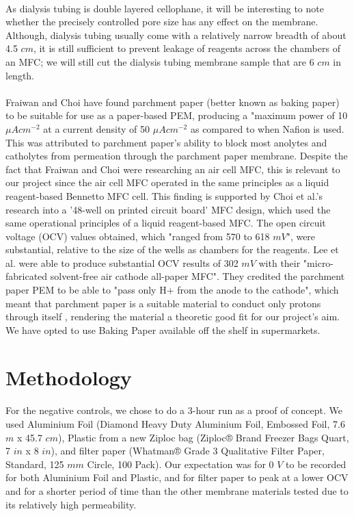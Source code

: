 \documentclass[12pt, twocolumn, a4paper]{article}
\begin{document}
    \paragraph{}As dialysis tubing is double layered cellophane, it will be interesting to note whether the precisely controlled pore size has any effect on the membrane. Although, dialysis tubing usually come with a relatively narrow breadth of about 4.5 $cm$, it is still sufficient to prevent leakage of reagents across the chambers of an MFC; we will still cut the dialysis tubing membrane sample that are 6 $cm$ in length.

   \paragraph{}Fraiwan and Choi \cite{C4CP04804K} have found parchment paper (better known as baking paper) to be suitable for use as a paper-based PEM, producing a "maximum power of 10 $\mu A cm^{-2}$ at a current density of 50 $\mu A cm^{-2}$ as compared to when Nafion is used.  This was attributed to parchment paper's ability to block most anolytes and catholytes from permeation through the parchment paper membrane. Despite the fact that Fraiwan and Choi were researching an air cell MFC, this is relevant to our project since the air cell MFC operated in the same principles as a liquid reagent-based Bennetto MFC cell. This finding is supported by Choi et al.'s \cite{C5AN00492F} research into a '48-well on printed circuit board' MFC design, which used the same operational principles of a liquid reagent-based MFC. The open circuit voltage (OCV) values obtained, which "ranged from 570 to 618 $mV$", were substantial, relative to the size of the wells as chambers for the reagents. Lee et al. \cite{Lee2016-xq} were able to produce substantial OCV results of 302 $mV$ with their "micro-fabricated solvent-free air cathode all-paper MFC". They credited the parchment paper PEM to be able to "pass only H+ from the anode to the cathode", which meant that parchment paper is a suitable material to conduct only protons through itself \cite{doi:10.1021/acs.chemrev.6b00159}, rendering the material a theoretic good fit for our project's aim. We have opted to use Baking Paper available off the shelf in supermarkets.
\section{Methodology}
\paragraph{}For the negative controls, we chose to do a 3-hour run as a proof of concept. We used Aluminium Foil (Diamond Heavy Duty Aluminium Foil, Embossed Foil, 7.6 $m$ x 45.7 $cm$), Plastic from a new Ziploc bag (Ziploc® Brand Freezer Bags Quart, 7 $in$ x 8 $in$), and filter paper (Whatman® Grade 3 Qualitative Filter Paper, Standard, 125 $mm$ Circle, 100 Pack). Our expectation was for 0 $V$ to be recorded for both Aluminium Foil and Plastic, and for filter paper to peak at a lower OCV and for a shorter period of time than the other membrane materials tested due to its relatively high permeability.
\end{document}
